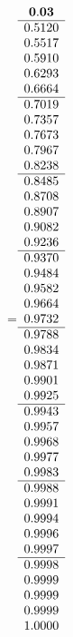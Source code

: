 =\hbox{$\begin{array}{c}
\bf 0.03 
 \\ \hline 
  0.5120 \\ 
  0.5517 \\ 
  0.5910 \\ 
  0.6293 \\ 
  0.6664
 \\ \hline 
  0.7019 \\ 
  0.7357 \\ 
  0.7673 \\ 
  0.7967 \\ 
  0.8238
 \\ \hline 
  0.8485 \\ 
  0.8708 \\ 
  0.8907 \\ 
  0.9082 \\ 
  0.9236
 \\ \hline 
  0.9370 \\ 
  0.9484 \\ 
  0.9582 \\ 
  0.9664 \\ 
  0.9732
 \\ \hline 
  0.9788 \\ 
  0.9834 \\ 
  0.9871 \\ 
  0.9901 \\ 
  0.9925
 \\ \hline 
  0.9943 \\ 
  0.9957 \\ 
  0.9968 \\ 
  0.9977 \\ 
  0.9983
 \\ \hline 
  0.9988 \\ 
  0.9991 \\ 
  0.9994 \\ 
  0.9996 \\ 
  0.9997
 \\ \hline 
  0.9998 \\ 
  0.9999 \\ 
  0.9999 \\ 
  0.9999 \\ 
  1.0000
 \end{array}$}
